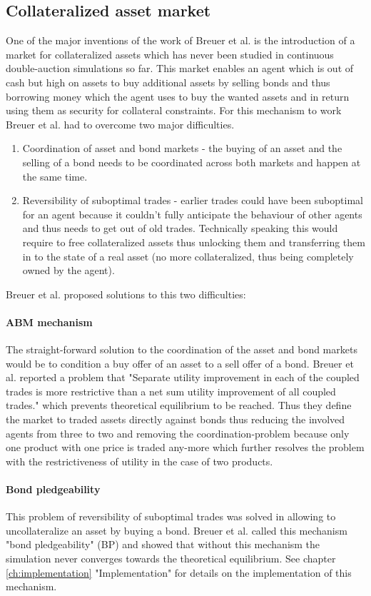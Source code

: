 \documentclass[../Bachelorarbeit.tex]{subfiles}
\begin{document}
\subsection{Collateralized asset market}
One of the major inventions of the work of Breuer et al. is the introduction of a market for collateralized assets which has never been studied in continuous double-auction simulations so far. This market enables an agent which is out of cash but high on assets to buy additional assets by selling bonds and thus borrowing money which the agent uses to buy the wanted assets and in return using them as security for collateral constraints. For this mechanism to work Breuer et al. had to overcome two major difficulties.

\begin{enumerate}
\item Coordination of asset and bond markets - the buying of an asset and the selling of a bond needs to be coordinated across both markets and happen at the same time.
\item Reversibility of suboptimal trades - earlier trades could have been suboptimal for an agent because it couldn't fully anticipate the behaviour of other agents and thus needs to get out of old trades. Technically speaking this would require to free collateralized assets thus unlocking them and transferring them in to the state of a real asset (no more collateralized, thus being completely owned by the agent).
\end{enumerate}

Breuer et al. proposed solutions to this two difficulties:
\paragraph{ABM mechanism}
The straight-forward solution to the coordination of the asset and bond markets would be to condition a buy offer of an asset to a sell offer of a bond. Breuer et al. reported a problem that "Separate utility improvement in each of the coupled trades is more restrictive than a net sum utility improvement of all coupled trades." which prevents theoretical equilibrium to be reached. Thus they define the market to traded assets directly against bonds thus reducing the involved agents from three to two and removing the coordination-problem because only one product with one price is traded any-more which further resolves the problem with the restrictiveness of utility in the case of two products.

\paragraph{Bond pledgeability}
This problem of reversibility of suboptimal trades was solved in allowing to uncollateralize an asset by buying a bond. Breuer et al. called this mechanism "bond pledgeability" (BP) and showed that without this mechanism the simulation never converges towards the theoretical equilibrium. See chapter \ref{ch:implementation} "Implementation" for details on the implementation of this mechanism.
\end{document}

